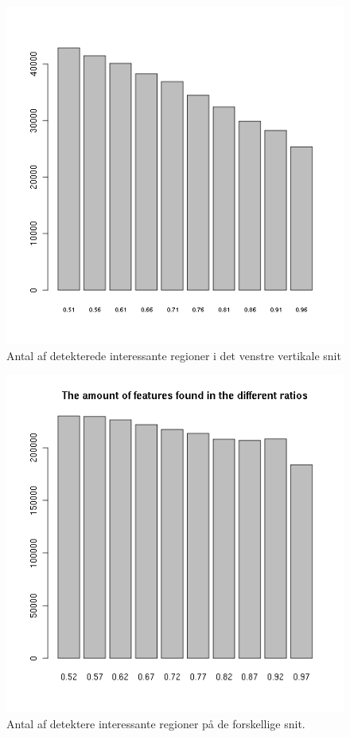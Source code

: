 {\begin{figure}[ht]
\begin{minipage}[b]{0.5\linewidth}
\begin{center}
		\includegraphics[scale=0.4]{afsnit/resultater/billeder/cut3featsperratio.png}
		\caption{Antal af detekterede interessante regioner i det
		venstre vertikale snit}
		\label{cut1feats}
		\end{center}
	\end{minipage}
\end{figure}

\begin{figure}[h!]
	\begin{center}
		\includegraphics[scale=0.5]{afsnit/resultater/billeder/featsperratio.png}
	\end{center}
	\caption{Antal af detektere interessante regioner på de forskellige snit.}
	\label{diffratios}
\end{figure}




}
